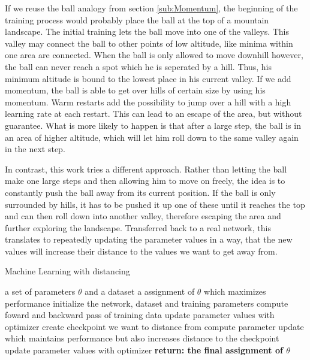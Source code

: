 If we reuse the ball analogy from section \ref{sub:Momentum}, the beginning of
the training process would probably place the ball at the top of a mountain
landscape. The initial training lets the ball move into one of the valleys.
This valley may connect the ball to other points of low altitude, like minima
within one area are connected. When the ball is only allowed to move downhill
however, the ball can never reach a spot which he is seperated by a hill. Thus,
his minimum altitude is bound to the lowest place in his current valley. If we
add momentum, the ball is able to get over hills of certain
size by using his momentum. Warm restarts add the possibility to jump over a
hill with a high learning rate at each restart. This can lead to an escape of
the area, but without guarantee. What is more likely to happen is that after a
large step, the ball is in an area of higher altitude, which will let him roll
down to the same valley again in the next step.

In contrast, this work tries a different approach. Rather than letting the ball
make one large steps and then allowing him to move on freely, the idea is to
constantly push the ball away from its current position. If the ball is only
surrounded by hills, it has to be pushed it up one of these until it reaches the
top and can then roll down into another valley, therefore escaping the area and
further exploring the landscape. Transferred back to a real network, this
translates to repeatedly updating the parameter values in a way, that the new
values will increase their distance to the values we want to get away from.


\begin{algorithm}
    \hypertarget{alg:Distancing}{}
    \begin{algorithmic}[1]
        \caption{Machine Learning with distancing}
        \REQUIRE a set of parameters $\theta$ and a dataset
        \ENSURE a assignment of $\theta$ which maximizes performance
        \STATE initialize the network, dataset and training parameters
            \STATE compute foward and backward pass of training data
            \STATE update parameter values with optimizer
        \ENDFOR
        \STATE create checkpoint we want to distance from
			\STATE compute parameter update which maintains performance but also increases distance to the checkpoint
			\ENDFOR
		\STATE update parameter values with optimizer
        \ENDFOR
        \STATE \textbf{return: the final assignment of $\theta$}
    \end{algorithmic}
\end{algorithm}

